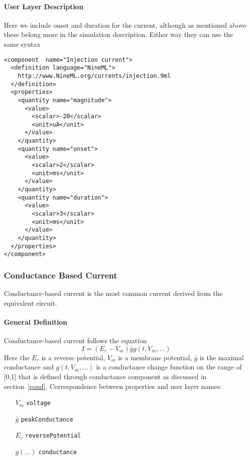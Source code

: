 \documentclass{article}
\begin{document}
\paragraph{User Layer Description}
Here we include onset and duration for the current, although as mentioned above
these belong more in the simulation description. Either way they can use the
same syntax
\begin{verbatim}
<component  name="Injection current">
  <definition language="NineML">
    http://www.NineML.org/currents/injection.9ml
  </definition>
  <properties>
    <quantity name="magnitude">
      <value>
        <scalar>-20</scalar>
        <unit>uA</unit>
      </value>
    </quantity>
    <quantity name="onset">
      <value>
        <scalar>2</scalar>
        <unit>ms</unit>
      </value>
    </quantity>
    <quantity name="duration">
      <value>
        <scalar>3</scalar>
        <unit>ms</unit>
      </value>
    </quantity>
  </properties>
</component>
\end{verbatim}

\subsubsection{Conductance Based Current}
\label{cond-curr}
Conductance-based current is the most common current derived from the equivalent
circuit.

\paragraph{General Definition}

Conductance-based current follows the equation
\begin{equation}
I=(E_r-V_m)\bar g g(t,V_m,...)
\label{cond-current-eq}
\end{equation}
Here the $E_r$ is a reverse potential, $V_m$ is a membrane potential, $\bar g$ is the
maximal conductance and $g(t,V_m,...)$ is a conductance change function on the range of
[0,1] that is defined through conductance component as discussed in section~\ref{cond}.
Correspondence between properties and user layer names:
\begin{itemize}
\item[$V_m$] {\tt voltage}
\item[$\bar g$] {\tt peakConductance}
\item[$E_r$] {\tt reversePotential}
\item[$g(...)$] {\tt conductance}
\end{itemize}
\end{document}
